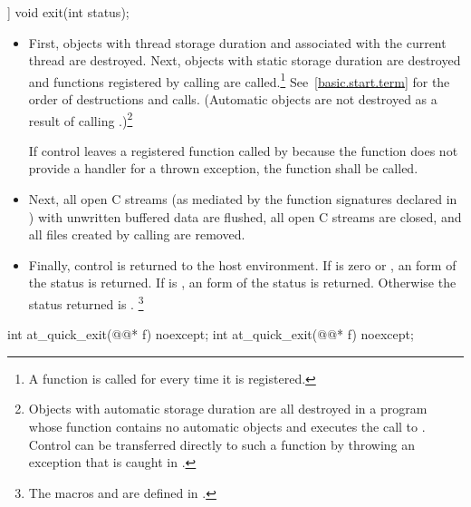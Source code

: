 %
\begin{itemdecl}
[[noreturn]] void exit(int status);
\end{itemdecl}

\begin{itemdescr}
\pnum
\effects
\begin{itemize}
\item
First, objects with thread storage duration and associated with the current thread
are destroyed. Next, objects with static storage duration are destroyed
and functions registered by calling
are called.\footnote{A function is called for every time it is registered.}
See~\ref{basic.start.term} for the order of destructions and calls.
(Automatic objects are not destroyed as a result of calling
.)\footnote{Objects with automatic storage duration are all destroyed in a program whose
 function
contains no automatic objects and executes the call to
.
Control can be transferred directly to such a
 function
by throwing an exception that is caught in
.}

If control leaves a registered function called by  because the function does
not provide a handler for a thrown exception, the function  shall be called.%
%

\item
Next, all open C streams (as mediated by the function
signatures declared in )
with unwritten buffered data are flushed, all open C
streams are closed, and all files created by calling
 are removed.

\item
Finally, control is returned to the host environment.
If  is zero or
,
an 
form of the status
is returned.
If  is
,
an  form of the status
is returned.
Otherwise the status returned is .%
\footnote{The macros  and 
are defined in .}
\end{itemize}
\end{itemdescr}

%
\begin{itemdecl}
int at_quick_exit(@@* f) noexcept;
int at_quick_exit(@@* f) noexcept;
\end{itemdecl}

